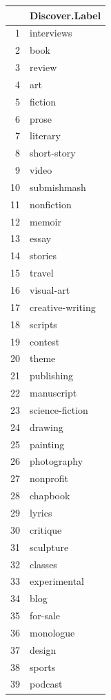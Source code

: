 \documentclass[]{report}   %
\begin{document}
\begin{figure}
\begin{minipage}[t]{0.24\textwidth}

\begin{tabular}{rl}
  \hline
 & Discover.Label \\ 
  \hline
1 & interviews \\ 
  2 & book \\ 
  3 & review \\ 
  4 & art \\ 
  5 & fiction \\ 
  6 & prose \\ 
  7 & literary \\ 
  8 & short-story \\ 
  9 & video \\ 
  10 & submishmash \\ 
  11 & nonfiction \\ 
  12 & memoir \\ 
  13 & essay \\ 
  14 & stories \\ 
  15 & travel \\ 
  16 & visual-art \\ 
  17 & creative-writing \\ 
  18 & scripts \\ 
  19 & contest \\ 
  20 & theme \\ 
  21 & publishing \\ 
  22 & manuscript \\ 
  23 & science-fiction \\ 
  24 & drawing \\ 
  25 & painting \\ 
  26 & photography \\ 
  27 & nonprofit \\ 
  28 & chapbook \\ 
  29 & lyrics \\ 
  30 & critique \\ 
  31 & sculpture \\ 
  32 & classes \\ 
  33 & experimental \\ 
  34 & blog \\ 
  35 & for-sale \\ 
  36 & monologue \\ 
  37 & design \\ 
  38 & sports \\ 
  39 & podcast \\ 

\end{tabular}
\end{minipage}
\end{figure}
\end{document}

